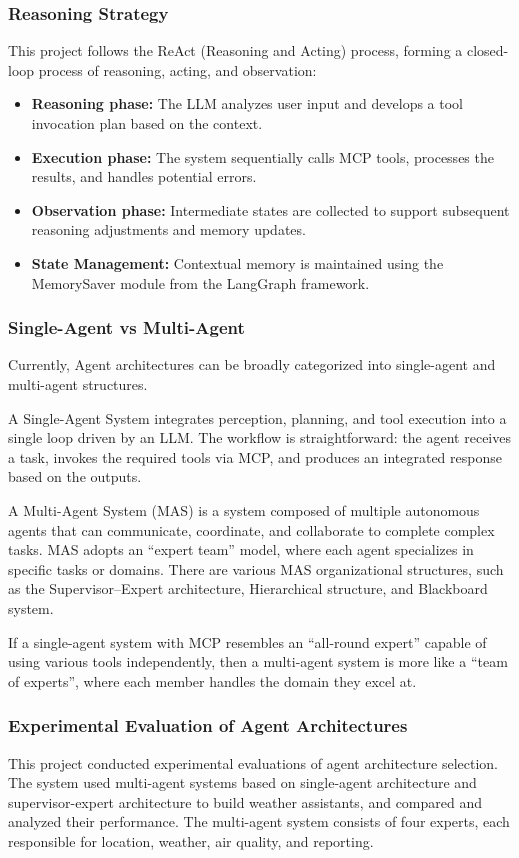 \documentclass[final-report]{report-template}
\begin{document}
\subsubsection{Reasoning Strategy}
This project follows the ReAct (Reasoning and Acting) process, forming a closed-loop process of reasoning, acting, and observation:

\begin{itemize}
    \item \textbf{Reasoning phase:} The LLM analyzes user input and develops a tool invocation plan based on the context.
    \item \textbf{Execution phase:} The system sequentially calls MCP tools, processes the results, and handles potential errors.
    \item \textbf{Observation phase:} Intermediate states are collected to support subsequent reasoning adjustments and memory updates.
    \item \textbf{State Management:} Contextual memory is maintained using the MemorySaver module from the LangGraph framework.  
\end{itemize}

\subsubsection{Single-Agent vs Multi-Agent}
Currently, Agent architectures can be broadly categorized into single-agent and multi-agent structures.

A Single-Agent System integrates perception, planning, and tool execution into a single loop driven by an LLM. The workflow is straightforward: the agent receives a task, invokes the required tools via MCP, and produces an integrated response based on the outputs.

A Multi-Agent System (MAS) is a system composed of multiple autonomous agents that can communicate, coordinate, and collaborate to complete complex tasks. MAS adopts an “expert team” model, where each agent specializes in specific tasks or domains. There are various MAS organizational structures, such as the Supervisor–Expert architecture, Hierarchical structure, and Blackboard system. 

If a single-agent system with MCP resembles an “all-round expert” capable of using various tools independently, then a multi-agent system is more like a “team of experts”, where each member handles the domain they excel at.

\subsubsection{Experimental Evaluation of Agent Architectures
}
This project conducted experimental evaluations of agent architecture selection. The system used multi-agent systems based on single-agent architecture and supervisor-expert architecture to build weather assistants, and compared and analyzed their performance. The multi-agent system consists of four experts, each responsible for location, weather, air quality, and reporting.
\end{document}
